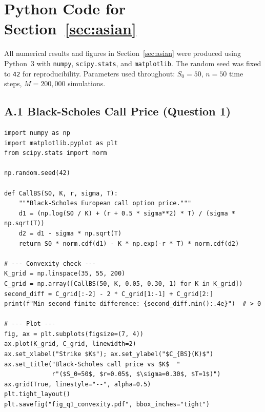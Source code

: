 \documentclass[11pt,a4paper]{article}
\theoremstyle{plain}
\theoremstyle{definition}
\begin{document}
\newpage



\newpage
\appendix
\section{Python Code for Section~\ref{sec:asian}}
\label{appendix:code}

All numerical results and figures in Section~\ref{sec:asian} were produced
using Python~3 with \texttt{numpy}, \texttt{scipy.stats}, and
\texttt{matplotlib}. The random seed was fixed to \texttt{42} for
reproducibility. Parameters used throughout: $S_0 = 50$, $n = 50$ time
steps, $M = 200{,}000$ simulations.

\subsection*{A.1 \quad Black-Scholes Call Price (Question 1)}

\begin{lstlisting}[style=pythonstyle,
  caption={Black-Scholes European call price and convexity check.}]
import numpy as np
import matplotlib.pyplot as plt
from scipy.stats import norm

np.random.seed(42)

def CallBS(S0, K, r, sigma, T):
    """Black-Scholes European call option price."""
    d1 = (np.log(S0 / K) + (r + 0.5 * sigma**2) * T) / (sigma * np.sqrt(T))
    d2 = d1 - sigma * np.sqrt(T)
    return S0 * norm.cdf(d1) - K * np.exp(-r * T) * norm.cdf(d2)

# --- Convexity check ---
K_grid = np.linspace(35, 55, 200)
C_grid = np.array([CallBS(50, K, 0.05, 0.30, 1) for K in K_grid])
second_diff = C_grid[:-2] - 2 * C_grid[1:-1] + C_grid[2:]
print(f"Min second finite difference: {second_diff.min():.4e}")  # > 0

# --- Plot ---
fig, ax = plt.subplots(figsize=(7, 4))
ax.plot(K_grid, C_grid, linewidth=2)
ax.set_xlabel("Strike $K$"); ax.set_ylabel("$C_{BS}(K)$")
ax.set_title("Black-Scholes call price vs $K$  "
             r"($S_0=50$, $r=0.05$, $\sigma=0.30$, $T=1$)")
ax.grid(True, linestyle="--", alpha=0.5)
plt.tight_layout()
plt.savefig("fig_q1_convexity.pdf", bbox_inches="tight")
\end{lstlisting}
\end{document}
